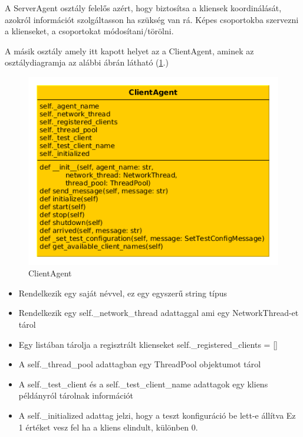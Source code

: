 \documentclass[a4paper,12pt,oneside]{report}
\begin{document}
A ServerAgent osztály felelős azért, hogy biztosítsa a kliensek koordinálását, azokról információt szolgáltasson ha szükség van rá.
Képes csoportokba szervezni a klienseket, a csoportokat módosítani/törölni.

A másik osztály amely itt kapott helyet az a ClientAgent, aminek az osztálydiagramja az alábbi ábrán látható (\ref{fig:clientagent_class}.)

    \begin{figure}[h]
      \includegraphics[width=13cm, keepaspectratio]{clientagent_class.png}
      \caption{ClientAgent}
      \label{fig:clientagent_class}
    \end{figure}
    
\begin{itemize}
    \itemsep0em
        \item Rendelkezik egy saját névvel, ez egy egyszerű string típus
        \item Rendelkezik egy self.\_network\_thread adattaggal ami egy NetworkThread-et tárol
        \item Egy listában tárolja a regisztrált klienseket self.\_registered\_clients = []
        \item A self.\_thread\_pool adattagban egy ThreadPool objektumot tárol
        \item A self.\_test\_client és a self.\_test\_client\_name adattagok egy kliens példányról tárolnak információt
         \item  A self.\_initialized adattag jelzi, hogy a teszt konfiguráció be lett-e állítva
         Ez 1 értéket vesz fel ha a kliens elindult, különben 0.
\end{itemize}
    
\end{document}

